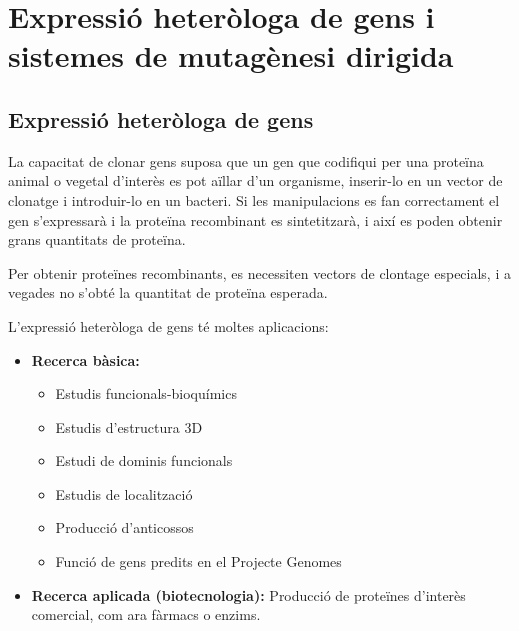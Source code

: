 \section{Expressió heteròloga de gens i sistemes de mutagènesi dirigida}
\label{sec:expr-heter-de}

\subsection{Expressió heteròloga de gens}
\label{sec:expressio-heterologa}
La capacitat de clonar gens suposa que un gen que codifiqui per una
proteïna animal o vegetal d'interès es pot aïllar d'un organisme,
inserir-lo en un vector de clonatge i introduir-lo en un bacteri. Si
les manipulacions es fan correctament el gen s'expressarà i la
proteïna recombinant es sintetitzarà, i així es poden obtenir grans
quantitats de proteïna.

Per obtenir proteïnes recombinants, es necessiten vectors de clontage
especials, i a vegades no s'obté la quantitat de proteïna esperada.

L'expressió heteròloga de gens té moltes aplicacions:
\begin{itemize}
\item \textbf{Recerca bàsica:}
  \begin{itemize}
  \item Estudis funcionals-bioquímics
  \item Estudis d'estructura 3D
  \item Estudi de dominis funcionals
  \item Estudis de localització
  \item Producció d'anticossos
  \item Funció de gens predits en el Projecte Genomes
  \end{itemize}

\item \textbf{Recerca aplicada (biotecnologia):} Producció de proteïnes
  d'interès comercial, com ara fàrmacs o enzims.
\end{itemize}

